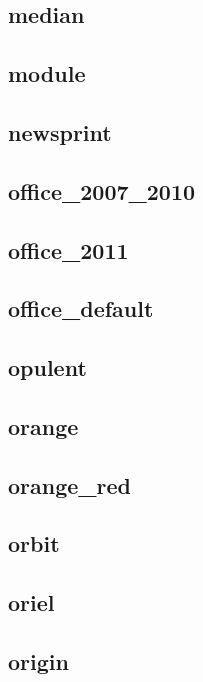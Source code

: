 \subsection{\ttfamily median}
\newpage
\subsection{\ttfamily module}
\newpage
\subsection{\ttfamily newsprint}
\newpage
\subsection{\ttfamily office\_2007\_2010}
\newpage
\subsection{\ttfamily office\_2011}
\newpage
\subsection{\ttfamily office\_default}
\newpage
\subsection{\ttfamily opulent}
\newpage
\subsection{\ttfamily orange}
\newpage
\subsection{\ttfamily orange\_red}
\newpage
\subsection{\ttfamily orbit}
\newpage
\subsection{\ttfamily oriel}
\newpage
\subsection{\ttfamily origin}
\newpage

